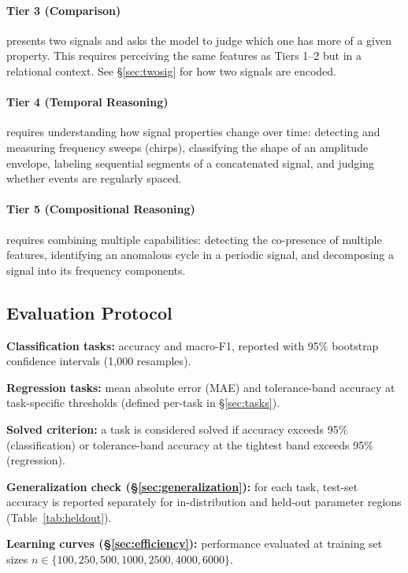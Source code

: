 \documentclass[11pt]{article}
\begin{document}
\paragraph{Tier 3 (Comparison)} presents two signals and asks the model to judge which one has more of a given property. This requires perceiving the same features as Tiers 1--2 but in a relational context. See \S\ref{sec:twosig} for how two signals are encoded.

\paragraph{Tier 4 (Temporal Reasoning)} requires understanding how signal properties change over time: detecting and measuring frequency sweeps (chirps), classifying the shape of an amplitude envelope, labeling sequential segments of a concatenated signal, and judging whether events are regularly spaced.

\paragraph{Tier 5 (Compositional Reasoning)} requires combining multiple capabilities: detecting the co-presence of multiple features, identifying an anomalous cycle in a periodic signal, and decomposing a signal into its frequency components.


\subsection{Evaluation Protocol}
\label{sec:eval}

\textbf{Classification tasks:} accuracy and macro-F1, reported with 95\% bootstrap confidence intervals (1{,}000 resamples).

\textbf{Regression tasks:} mean absolute error (MAE) and tolerance-band accuracy at task-specific thresholds (defined per-task in \S\ref{sec:tasks}).

\textbf{Solved criterion:} a task is considered solved if accuracy exceeds 95\% (classification) or tolerance-band accuracy at the tightest band exceeds 95\% (regression).

\textbf{Generalization check (\S\ref{sec:generalization}):} for each task, test-set accuracy is reported separately for in-distribution and held-out parameter regions (Table~\ref{tab:heldout}).

\textbf{Learning curves (\S\ref{sec:efficiency}):} performance evaluated at training set sizes $n \in \{100, 250, 500, 1000, 2500, 4000, 6000\}$.
\end{document}
